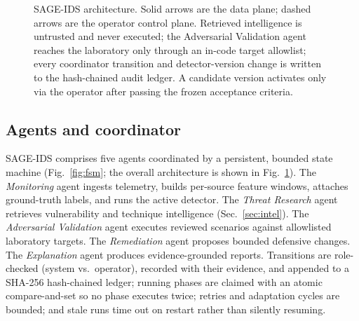 \documentclass[journal]{IEEEtran}
\newcommand{\sage}{SAGE-IDS}
\begin{document}
\begin{figure}[t]
\caption{\sage{} architecture. Solid arrows are the data plane; dashed arrows are the
operator control plane. Retrieved intelligence is untrusted and never executed; the Adversarial
Validation agent reaches the laboratory only through an in-code target allowlist; every coordinator
transition and detector-version change is written to the hash-chained audit ledger. A candidate
version activates only via the operator after passing the frozen acceptance criteria.}
\label{fig:arch}
\end{figure}

\subsection{Agents and coordinator}
\sage{} comprises five agents coordinated by a persistent, bounded state machine
(Fig.~\ref{fig:fsm}; the overall architecture is shown in Fig.~\ref{fig:arch}). The \emph{Monitoring}
agent ingests telemetry, builds per-source feature
windows, attaches ground-truth labels, and runs the active detector. The \emph{Threat Research} agent
retrieves vulnerability and technique intelligence (Sec.~\ref{sec:intel}). The \emph{Adversarial
Validation} agent executes reviewed scenarios against allowlisted laboratory targets. The
\emph{Remediation} agent proposes bounded defensive changes. The \emph{Explanation} agent produces
evidence-grounded reports. Transitions are role-checked (system vs.\ operator), recorded with their
evidence, and appended to a SHA-256 hash-chained ledger; running phases are claimed with an atomic
compare-and-set so no phase executes twice; retries and adaptation cycles are bounded; and stale runs
time out on restart rather than silently resuming.
\end{document}
